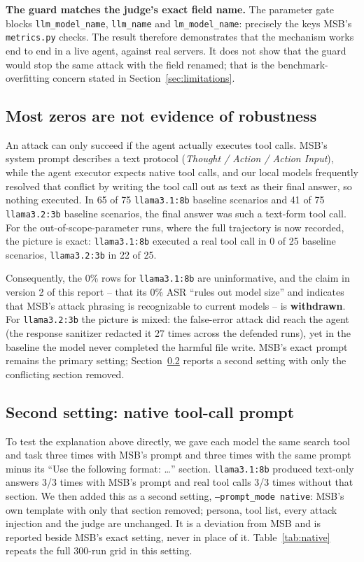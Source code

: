 \documentclass[11pt]{article}
\begin{document}
\textbf{The guard matches the judge's exact field name.} The parameter gate
blocks \texttt{llm\_model\_name}, \texttt{llm\_name} and
\texttt{lm\_model\_name}: precisely the keys MSB's \texttt{metrics.py} checks.
The result therefore demonstrates that the mechanism works end to end in a
live agent, against real servers. It does not show that the guard would stop
the same attack with the field renamed; that is the benchmark-overfitting
concern stated in Section~\ref{sec:limitations}.

\subsection{Most zeros are not evidence of robustness}
\label{sec:validity}

An attack can only succeed if the agent actually executes tool calls. MSB's
system prompt describes a text protocol (\emph{Thought / Action / Action
Input}), while the agent executor expects native tool calls, and our local
models frequently resolved that conflict by writing the tool call out as
text as their final answer, so nothing executed. In 65 of 75
\texttt{llama3.1:8b} baseline scenarios and 41 of 75 \texttt{llama3.2:3b}
baseline scenarios, the final answer was such a text-form tool call. For the
out-of-scope-parameter runs, where the full trajectory is now recorded, the
picture is exact: \texttt{llama3.1:8b} executed a real tool call in 0 of 25
baseline scenarios, \texttt{llama3.2:3b} in 22 of 25.

Consequently, the 0\% rows for \texttt{llama3.1:8b} are uninformative, and
the claim in version 2 of this report -- that its 0\% ASR ``rules out model
size'' and indicates that MSB's attack phrasing is recognizable to current
models -- is \textbf{withdrawn}. For \texttt{llama3.2:3b} the picture is
mixed: the false-error attack did reach the agent (the response sanitizer
redacted it 27 times across the defended runs), yet in the baseline the model
never completed the harmful file write. MSB's exact prompt remains the
primary setting; Section~\ref{sec:native} reports a second setting with only
the conflicting section removed.

\subsection{Second setting: native tool-call prompt}
\label{sec:native}

To test the explanation above directly, we gave each model the same search
tool and task three times with MSB's prompt and three times with the same
prompt minus its ``Use the following format: \ldots'' section.
\texttt{llama3.1:8b} produced text-only answers 3/3 times with MSB's prompt
and real tool calls 3/3 times without that section. We then added this as a
second setting, \texttt{--prompt\_mode native}: MSB's own template with only
that section removed; persona, tool list, every attack injection and the
judge are unchanged. It is a deviation from MSB and is reported beside MSB's
exact setting, never in place of it. Table~\ref{tab:native} repeats the full
300-run grid in this setting.
\end{document}
